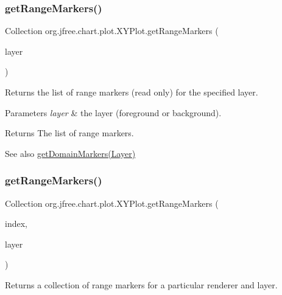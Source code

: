 \subsubsection{\texorpdfstring{get\+Range\+Markers()}{getRangeMarkers()}\hspace{0.1cm}{\footnotesize\ttfamily [1/2]}}
{\footnotesize\ttfamily Collection org.\+jfree.\+chart.\+plot.\+X\+Y\+Plot.\+get\+Range\+Markers (\begin{DoxyParamCaption}\item[{Layer}]{layer }\end{DoxyParamCaption})}

Returns the list of range markers (read only) for the specified layer.


\begin{DoxyParams}{Parameters}
{\em layer} & the layer (foreground or background).\\
\hline
\end{DoxyParams}
\begin{DoxyReturn}{Returns}
The list of range markers.
\end{DoxyReturn}
\begin{DoxySeeAlso}{See also}
\mbox{\hyperlink{classorg_1_1jfree_1_1chart_1_1plot_1_1_x_y_plot_a4c69a8c9c85f28518c9e297e51cc1cb0}{get\+Domain\+Markers(\+Layer)}} 
\end{DoxySeeAlso}
\mbox{\label{classorg_1_1jfree_1_1chart_1_1plot_1_1_x_y_plot_a04c8f145972330dcf231fea3844a09c4}} 
\subsubsection{\texorpdfstring{get\+Range\+Markers()}{getRangeMarkers()}\hspace{0.1cm}{\footnotesize\ttfamily [2/2]}}
{\footnotesize\ttfamily Collection org.\+jfree.\+chart.\+plot.\+X\+Y\+Plot.\+get\+Range\+Markers (\begin{DoxyParamCaption}\item[{int}]{index,  }\item[{Layer}]{layer }\end{DoxyParamCaption})}

Returns a collection of range markers for a particular renderer and layer.


